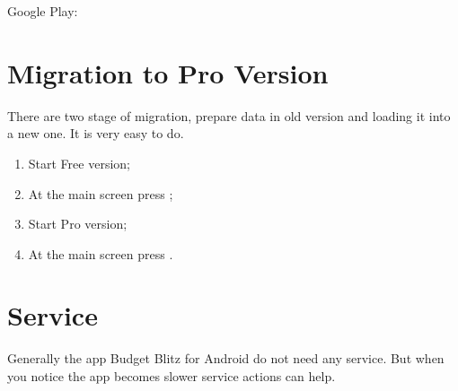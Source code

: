 \documentclass[a4paper,10pt,english]{sphinxmanual}
\begin{document}
\sphinxAtStartPar
Google Play:

\sphinxAtStartPar
{}

\sphinxAtStartPar
{}

\sphinxstepscope


\chapter{Migration to Pro Version}
\label{\detokenize{migration-to-pro:migration-to-pro-version}}\label{\detokenize{migration-to-pro:chapter-migration-to-pro}}\label{\detokenize{migration-to-pro::doc}}
\sphinxAtStartPar
There are two stage of migration, prepare data in old version and loading it into a new one.
It is very easy to do.
\begin{enumerate}
%
\item {} 
\sphinxAtStartPar
Start Free version;

\item {} 
\sphinxAtStartPar
At the main screen press ;

\item {} 
\sphinxAtStartPar
Start Pro version;

\item {} 
\sphinxAtStartPar
At the main screen press .

\end{enumerate}

\sphinxstepscope


\chapter{Service}
\label{\detokenize{service:service}}\label{\detokenize{service:chapter-service}}\label{\detokenize{service::doc}}
\sphinxAtStartPar
Generally the app Budget Blitz for Android do not need any service. But when you notice
the app becomes slower service actions can help.

\noindent{}
\noindent{}
\noindent{}
\end{document}
